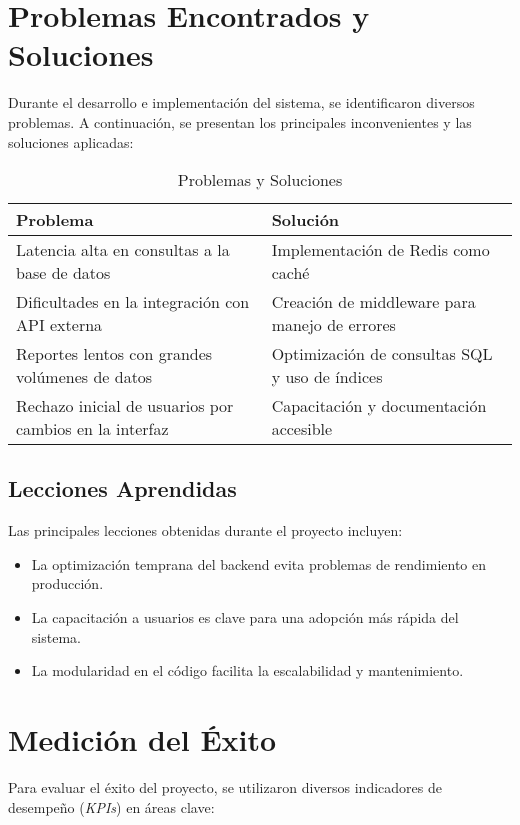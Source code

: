 \section{Problemas Encontrados y Soluciones}

Durante el desarrollo e implementación del sistema, se identificaron diversos problemas. A continuación, se presentan los principales inconvenientes y las soluciones aplicadas:

\begin{table}[h]
	\centering
	\begin{tabular}{|p{5cm}|p{5cm}|}
		\hline
		\textbf{Problema} & \textbf{Solución} \\ \hline
		Latencia alta en consultas a la base de datos & Implementación de Redis como caché \\ \hline
		Dificultades en la integración con API externa & Creación de middleware para manejo de errores \\ \hline
		Reportes lentos con grandes volúmenes de datos & Optimización de consultas SQL y uso de índices \\ \hline
		Rechazo inicial de usuarios por cambios en la interfaz & Capacitación y documentación accesible \\ \hline
	\end{tabular}
	\caption{Problemas y Soluciones}
\end{table}

\subsection{Lecciones Aprendidas}
Las principales lecciones obtenidas durante el proyecto incluyen:

\begin{itemize}
	\item La optimización temprana del backend evita problemas de rendimiento en producción.
	\item La capacitación a usuarios es clave para una adopción más rápida del sistema.
	\item La modularidad en el código facilita la escalabilidad y mantenimiento.
\end{itemize}



\section{Medición del Éxito}

Para evaluar el éxito del proyecto, se utilizaron diversos indicadores de desempeño (\textit{KPIs}) en áreas clave:

